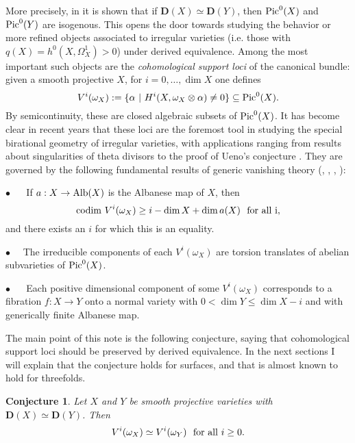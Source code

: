 \documentclass{amsart}
\theoremstyle{plain}
\newtheorem{conjecture}[theorem]{Conjecture}
\theoremstyle{definition}
\numberwithin{equation}{section}
\begin{document}
More precisely, in \cite{PS} it is shown that if ${\mathbf{D}}(X) \simeq {\mathbf{D}}(Y)$, then ${\rm Pic}^0 (X)$ and ${\rm Pic}^0 (Y)$ are isogenous. 
This opens the door towards studying the behavior or more refined objects associated to irregular varieties
(i.e. those with $q (X) = h^0 (X, \Omega_X^1) > 0$) under derived equivalence. Among the most important such objects 
are the \emph{cohomological support loci} of the canonical bundle: given a 
smooth projective $X$, for $i = 0, \ldots, \dim X$ one defines
$$V^i( \omega_X) : = \{ \alpha ~|~ H^i (X, \omega_X \otimes \alpha) \neq 0\} \subseteq {\rm Pic}^0 (X).$$
By semicontinuity, these are closed algebraic subsets of ${\rm Pic}^0 (X)$. 
It has become clear in recent years that these loci are the foremost tool in studying the special birational geometry of irregular 
varieties, with applications ranging from results about singularities of theta divisors 
\cite{EL} to the proof of Ueno's conjecture \cite{ChH}.
They are governed by the following fundamental results of generic vanishing theory (\cite{GL1}, \cite{GL2}, \cite{Arapura}, \cite{Simpson}):

\noindent
$\bullet$~ \,\,~If $a: X\rightarrow {\rm Alb}(X)$ is the Albanese map of $X$, then 
\begin{equation}\label{gv}
{\rm codim}~V^i (\omega_X) \ge i - \dim X + \dim a(X) \,\,\,\, {\rm for~all~i},
\end{equation}
and there exists an $i$ for which this is an equality.

\noindent
$\bullet$~\,\,~The  irreducible components of each $V^i (\omega_X)$ are torsion translates of
abelian subvarieties of ${{\rm Pic}}^0(X)$.

\noindent
$\bullet$ ~\,\,~Each positive dimensional component of some $V^i (\omega_X)$ corresponds to a fibration $f:X\rightarrow Y$ 
onto a normal variety with $0 < \dim Y \le \dim X - i$ and with generically finite Albanese map. 

The main point of this note is the following conjecture, saying that cohomological support loci should be preserved by derived equivalence. 
In the next sections I will explain that the conjecture holds for surfaces, and 
that is almost known to hold for threefolds.

\begin{conjecture}\label{main}
Let $X$ and $Y$ be smooth projective varieties with ${\mathbf{D}}(X) \simeq {\mathbf{D}}(Y)$. Then 
$$V^i (\omega_X)  \simeq V^i (\omega_Y) \,\,\,\, {\rm for ~all~} i \ge 0.$$ 
\end{conjecture}
\end{document}
